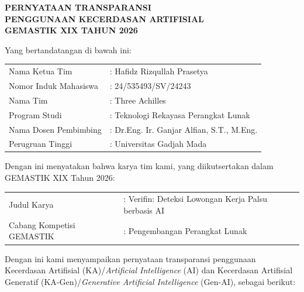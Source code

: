 \documentclass[10pt]{article}
\begin{document}
\begin{center}
{\fontsize{13}{15}\selectfont\bfseries
PERNYATAAN TRANSPARANSI\\
PENGGUNAAN KECERDASAN ARTIFISIAL\\
GEMASTIK XIX TAHUN 2026}
\end{center}

\vspace{0.8em}

Yang bertandatangan di bawah ini:

\vspace{0.3em}

\begin{tabularx}{\textwidth}{@{}p{4.2cm}l@{}}
Nama Ketua Tim & : Hafidz Rizqullah Prasetya \\[3pt]
Nomor Induk Mahasiswa & : 24/535493/SV/24243 \\[3pt]
Nama Tim & : Three Achilles \\[3pt]
Program Studi & : Teknologi Rekayasa Perangkat Lunak \\[3pt]
Nama Dosen Pembimbing & : Dr.Eng. Ir. Ganjar Alfian, S.T., M.Eng. \\[3pt]
Perugruan Tinggi & : Universitas Gadjah Mada \\
\end{tabularx}

\vspace{0.5em}

Dengan ini menyatakan bahwa karya tim kami, yang diikutsertakan dalam GEMASTIK XIX Tahun 2026:

\vspace{0.3em}

\begin{tabularx}{\textwidth}{@{}p{4.2cm}l@{}}
Judul Karya & : Verifin: Deteksi Lowongan Kerja Palsu berbasis AI \\[3pt]
Cabang Kompetisi GEMASTIK & : Pengembangan Perangkat Lunak \\
\end{tabularx}

\vspace{0.5em}

Dengan ini kami menyampaikan pernyataan transparansi penggunaan Kecerdasan Artifisial (KA)/\textit{Artificial Intelligence} (AI) dan Kecerdasan Artifisial Generatif (KA-Gen)/\textit{Generative Artificial Intelligence} (Gen-AI), sebagai berikut:

\vspace{0.3em}
\end{document}
